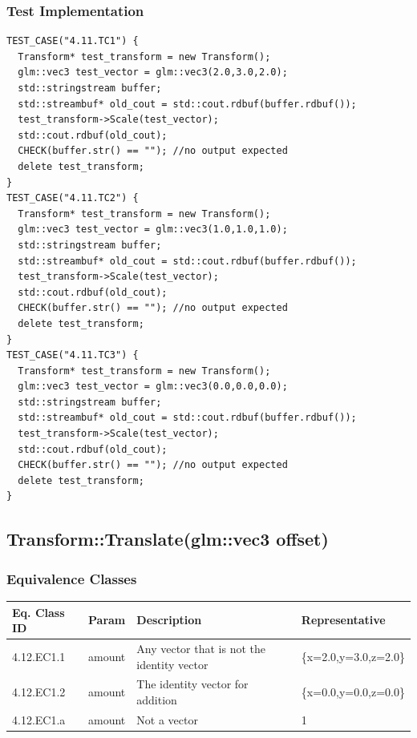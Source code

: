 \documentclass[11pt]{article}
\begin{document}
\subsubsection*{Test Implementation}
\label{sec:org2073c20}
\begin{verbatim}
TEST_CASE("4.11.TC1") {
  Transform* test_transform = new Transform();
  glm::vec3 test_vector = glm::vec3(2.0,3.0,2.0);
  std::stringstream buffer;
  std::streambuf* old_cout = std::cout.rdbuf(buffer.rdbuf());
  test_transform->Scale(test_vector);
  std::cout.rdbuf(old_cout);
  CHECK(buffer.str() == ""); //no output expected
  delete test_transform;
}
TEST_CASE("4.11.TC2") {
  Transform* test_transform = new Transform();
  glm::vec3 test_vector = glm::vec3(1.0,1.0,1.0);
  std::stringstream buffer;
  std::streambuf* old_cout = std::cout.rdbuf(buffer.rdbuf());
  test_transform->Scale(test_vector);
  std::cout.rdbuf(old_cout);
  CHECK(buffer.str() == ""); //no output expected
  delete test_transform;
}
TEST_CASE("4.11.TC3") {
  Transform* test_transform = new Transform();
  glm::vec3 test_vector = glm::vec3(0.0,0.0,0.0);
  std::stringstream buffer;
  std::streambuf* old_cout = std::cout.rdbuf(buffer.rdbuf());
  test_transform->Scale(test_vector);
  std::cout.rdbuf(old_cout);
  CHECK(buffer.str() == ""); //no output expected
  delete test_transform;
}
\end{verbatim}

\clearpage
\subsection{Transform::Translate(glm::vec3 offset)}
\label{sec:orgcd2317e}

\subsubsection*{Equivalence Classes}
\label{sec:orga2eb45b}
\begin{center}
\begin{tabularx}{\textwidth}{lXXX}
\hline
\textbf{Eq. Class ID} & \textbf{Param} & \textbf{Description} & \textbf{Representative}\\
\hline
4.12.EC1.1 & amount & Any vector that is not the identity vector & \{x=2.0,y=3.0,z=2.0\}\\
\hline
4.12.EC1.2 & amount & The identity vector for addition & \{x=0.0,y=0.0,z=0.0\}\\
\hline
4.12.EC1.a & amount & Not a vector & 1\\
\hline
\end{tabularx}
\end{center}
\end{document}
